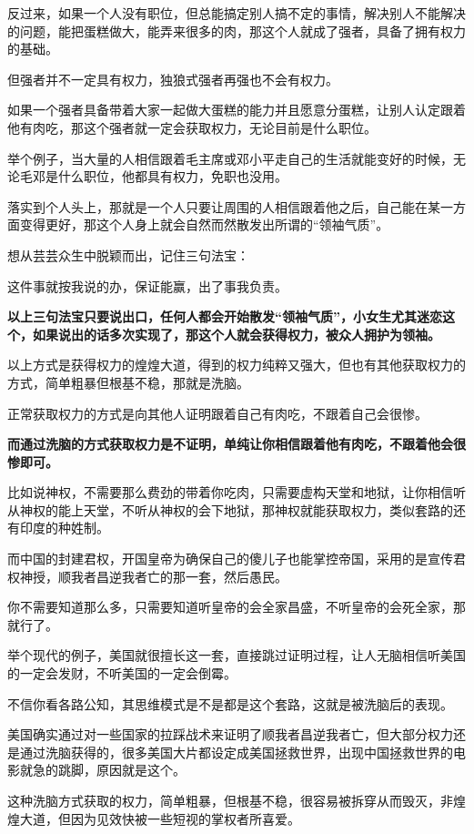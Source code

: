 \documentclass[UTF8, 11pt, oneside]{ctexart}
\newcommand{\zd}[1]{\textbf{\textcolor[RGB]{123,12,0}{#1}}} %
\newcommand{\yh}[1]{%
    \begin{tcolorbox}[enhanced,
        frame hidden, interior hidden,
        before skip = 5mm, left skip=10mm,
        borderline west={5pt}{0pt}{gray!50}]
        #1
    \end{tcolorbox}
}
\begin{document}
反过来，如果一个人没有职位，但总能搞定别人搞不定的事情，解决别人不能解决的问题，能把蛋糕做大，能弄来很多的肉，那这个人就成了强者，具备了拥有权力的基础。

但强者并不一定具有权力，独狼式强者再强也不会有权力。

如果一个强者具备带着大家一起做大蛋糕的能力并且愿意分蛋糕，让别人认定跟着他有肉吃，那这个强者就一定会获取权力，无论目前是什么职位。

举个例子，当大量的人相信跟着毛主席或邓小平走自己的生活就能变好的时候，无论毛邓是什么职位，他都具有权力，免职也没用。

落实到个人头上，那就是一个人只要让周围的人相信跟着他之后，自己能在某一方面变得更好，那这个人身上就会自然而然散发出所谓的“领袖气质”。

想从芸芸众生中脱颖而出，记住三句法宝：

\yh{
    这件事就按我说的办，保证能赢，出了事我负责。
}

\zd{以上三句法宝只要说出口，任何人都会开始散发“领袖气质”，小女生尤其迷恋这个，如果说出的话多次实现了，那这个人就会获得权力，被众人拥护为领袖。}

以上方式是获得权力的煌煌大道，得到的权力纯粹又强大，但也有其他获取权力的方式，简单粗暴但根基不稳，那就是洗脑。

正常获取权力的方式是向其他人证明跟着自己有肉吃，不跟着自己会很惨。

\zd{而通过洗脑的方式获取权力是不证明，单纯让你相信跟着他有肉吃，不跟着他会很惨即可。}

比如说神权，不需要那么费劲的带着你吃肉，只需要虚构天堂和地狱，让你相信听从神权的能上天堂，不听从神权的会下地狱，那神权就能获取权力，类似套路的还有印度的种姓制。

而中国的封建君权，开国皇帝为确保自己的傻儿子也能掌控帝国，采用的是宣传君权神授，顺我者昌逆我者亡的那一套，然后愚民。

你不需要知道那么多，只需要知道听皇帝的会全家昌盛，不听皇帝的会死全家，那就行了。

举个现代的例子，美国就很擅长这一套，直接跳过证明过程，让人无脑相信听美国的一定会发财，不听美国的一定会倒霉。

不信你看各路公知，其思维模式是不是都是这个套路，这就是被洗脑后的表现。

美国确实通过对一些国家的拉踩战术来证明了顺我者昌逆我者亡，但大部分权力还是通过洗脑获得的，很多美国大片都设定成美国拯救世界，出现中国拯救世界的电影就急的跳脚，原因就是这个。

这种洗脑方式获取的权力，简单粗暴，但根基不稳，很容易被拆穿从而毁灭，非煌煌大道，但因为见效快被一些短视的掌权者所喜爱。
\end{document}
